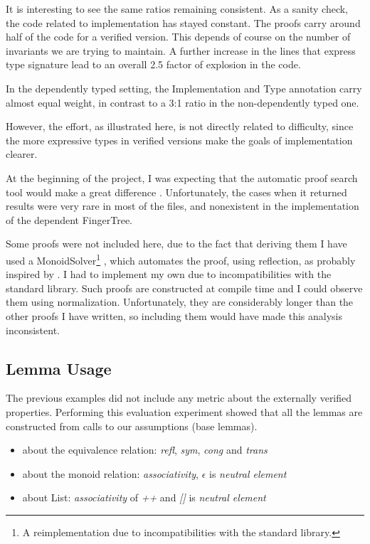 \documentclass[12pt,twoside,notitlepage]{report}
\begin{document}
It is interesting to see the same ratios remaining consistent. As a sanity check, the code related to implementation has stayed constant. The proofs carry around half of the code for a verified version. This depends of course on the number of invariants we are trying to maintain. A further increase in the lines that express type signature lead to an overall 2.5 factor of explosion in the code. 

In the dependently typed setting, the Implementation and Type annotation carry almost equal weight, in contrast to a 3:1 ratio in the non-dependently typed one.

However, the effort, as illustrated here, is not directly related to difficulty, since the more expressive types in verified versions make the goals of implementation clearer. 

At the beginning of the project, I was expecting that the automatic proof search tool would make a great difference \cite{auto}. Unfortunately, the cases when it returned results were very rare in most of the files, and nonexistent in the implementation of the dependent FingerTree. 

Some proofs were not included here, due to the fact that deriving them I have used a MonoidSolver\footnote{A reimplementation due to incompatibilities with the standard library.} , which automates the proof, using reflection, as probably inspired by \cite{reflection}. I had to implement my own due to incompatibilities with the standard library. Such proofs are constructed at compile time and I could observe them using normalization. Unfortunately, they are considerably longer than the other proofs I have written, so including them would have made this analysis inconsistent.

\subsection{Lemma Usage}
\label{eval:lemma}
The previous examples did not include any metric about the externally verified properties. 
Performing this evaluation experiment showed that all the lemmas are constructed from calls to our assumptions (base lemmas).

\begin{itemize}
\item about the equivalence relation: \textit{refl}, \textit{sym}, \textit{cong} and \textit{trans}
\item about the monoid relation: \textit{associativity}, $\epsilon$ is \textit{neutral element}
\item about List: \textit{associativity} of \textit{++} and \textit{[]} is \textit{neutral element}
\end{itemize} 
\end{document}
